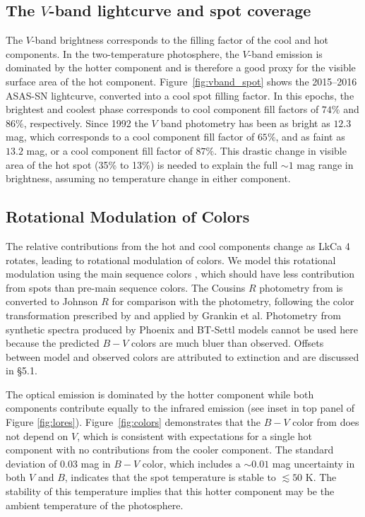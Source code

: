 \documentclass[12pt]{report}
\begin{document}
\subsection{The $V$-band lightcurve and spot coverage}\label{sec:rotSpot1}

The  $V$-band brightness corresponds to the filling factor of the cool and hot components.  In the two-temperature photosphere, the $V$-band emission is dominated by the hotter component and is therefore a good proxy for the visible surface area of the hot component.  Figure~\ref{fig:vband_spot} shows the 2015--2016 ASAS-SN lightcurve, converted into a cool spot filling factor.  In this epochs, the brightest and coolest phase corresponds to cool component fill factors of $74\%$ and $86\%$, respectively.  Since 1992 the $V$ band photometry has been as bright as $12.3$ mag, which corresponds to a cool component fill factor of $65\%$, and as faint as $13.2$ mag, or a cool component fill factor of $87\%$.  This drastic change in visible area of the hot spot (35\% to 13\%) is needed to explain the full $\sim 1$ mag range in brightness, assuming no temperature change in either component.


\subsection{Rotational Modulation of Colors}\label{sec:rotSpot}

The relative contributions from the hot and cool components change as LkCa 4 rotates, leading to rotational modulation of colors.  We model this rotational modulation using the main sequence colors \citep[compiled by][]{pecaut13}, which should have less contribution from spots than  pre-main sequence colors.  The Cousins $R$ photometry from \citet{pecaut13} is converted to Johnson $R$ for comparison with the \citet{grankin08} photometry, following the color transformation prescribed by \citet{landolt82} and applied by Grankin et al.  Photometry from synthetic spectra produced by Phoenix and BT-Settl models cannot be used here because the predicted $B-V$ colors are much bluer than observed.  Offsets between model and observed colors are attributed to extinction and are discussed in \S 5.1.

The optical emission is dominated by the hotter component while both components contribute equally to the infrared emission (see inset in top panel of Figure \ref{fig:lores}).  Figure~\ref{fig:colors} demonstrates that the $B-V$ color from \citet{grankin08} does not depend on $V$, which is consistent with expectations for a single hot component with no contributions from the cooler component.  The standard deviation of 0.03 mag in $B-V$ color, which includes a $\sim 0.01$ mag uncertainty in both $V$ and $B$, indicates that the spot temperature is stable to $\lesssim 50$ K.  The stability of this temperature implies that this hotter component may be the ambient temperature of the photosphere.
\end{document}
